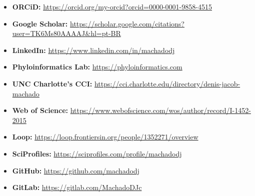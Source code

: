 \documentclass[11pt, letterpaper, sans]{moderncv}
\begin{document}
    \begin{itemize}
        \item \textbf{ORCiD:} \url{https://orcid.org/my-orcid?orcid=0000-0001-9858-4515}
        \item \textbf{Google Scholar:} \url{https://scholar.google.com/citations?user=TK6Ms80AAAAJ&hl=pt-BR}
        \item \textbf{LinkedIn:} \url{https://www.linkedin.com/in/machadodj}
        \item \textbf{Phyloinformatics Lab:} \url{https://phyloinformatics.com}
        \item \textbf{UNC Charlotte's CCI:} \url{https://cci.charlotte.edu/directory/denis-jacob-machado}
        \item \textbf{Web of Science:} \url{https://www.webofscience.com/wos/author/record/I-1452-2015}
        \item \textbf{Loop:} \url{https://loop.frontiersin.org/people/1352271/overview}
        \item \textbf{SciProfiles:} \url{https://sciprofiles.com/profile/machadodj}
        \item \textbf{GitHub:} \url{https://github.com/machadodj}
        \item \textbf{GitLab:} \url{https://gitlab.com/MachadoDJc}
    \end{itemize}
\end{document}
